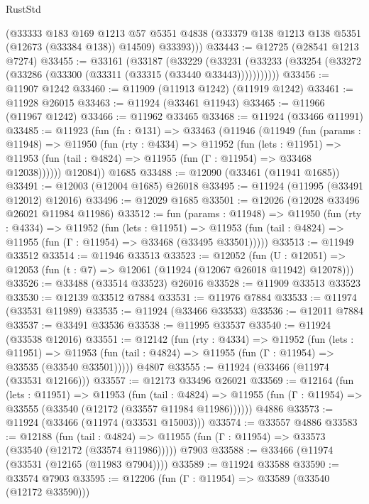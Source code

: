 \begin{lexlean}{RustStd}
\begin{coremodule}
{\begin{coremodule}
{{{{{{{{{{{{{{{{{{{{{{{{{{{{{{{{{{{{{{{{{{{{{{{{{{{{{{{{{{{{{{{{{{{{{{{{{{{{{{{{        (@33333
          @183
          @169
          @1213
          @57
          @5351
          @4838
          (@33379 @138 @1213 @138 @5351 (@12673 (@33384 @138)) @14509)
          @33393)))
@33443 := @12725 (@28541 @1213 @7274)
@33455 := @33161
    (@33187
      (@33229
        (@33231 (@33233 (@33254 (@33272 (@33286 (@33300 (@33311 (@33315 (@33440 @33443)))))))))))
@33456 := @11907 @1242
@33460 := @11909 (@11913 @1242) (@11919 @1242)
@33461 := @11928 @26015
@33463 := @11924 (@33461 @11943)
@33465 := @11966 (@11967 @1242)
@33466 := @11962 @33465
@33468 := @11924 (@33466 @11991)
@33485 := @11923
    (fun (fn : @131) =>
    @33463
      (@11946
        (@11949
          (fun (params : @11948) =>
          @11950
            (fun (rty : @4334) =>
            @11952
              (fun (lets : @11951) =>
              @11953 (fun (tail : @4824) => @11955 (fun (Γ : @11954) => @33468 @12038))))))
        @12084))
    @1685
@33488 := @12090 (@33461 (@11941 @1685))
@33491 := @12003 (@12004 @1685) @26018
@33495 := @11924 (@11995 (@33491 @12012) @12016)
@33496 := @12029 @1685
@33501 := @12026 (@12028 @33496 @26021 @11984 @11986)
@33512 := fun (params : @11948) =>
  @11950
    (fun (rty : @4334) =>
    @11952
      (fun (lets : @11951) =>
      @11953 (fun (tail : @4824) => @11955 (fun (Γ : @11954) => @33468 (@33495 @33501)))))
@33513 := @11949 @33512
@33514 := @11946 @33513
@33523 := @12052
    (fun (U : @12051) => @12053 (fun (t : @7) => @12061 (@11924 (@12067 @26018 @11942) @12078)))
@33526 := @33488 (@33514 @33523) @26016
@33528 := @11909 @33513 @33523
@33530 := @12139 @33512 @7884
@33531 := @11976 @7884
@33533 := @11974 (@33531 @11989)
@33535 := @11924 (@33466 @33533)
@33536 := @12011 @7884
@33537 := @33491 @33536
@33538 := @11995 @33537
@33540 := @11924 (@33538 @12016)
@33551 := @12142
    (fun (rty : @4334) =>
    @11952
      (fun (lets : @11951) =>
      @11953 (fun (tail : @4824) => @11955 (fun (Γ : @11954) => @33535 (@33540 @33501)))))
    @4807
@33555 := @11924 (@33466 (@11974 (@33531 @12166)))
@33557 := @12173 @33496 @26021
@33569 := @12164
    (fun (lets : @11951) =>
    @11953
      (fun (tail : @4824) =>
      @11955 (fun (Γ : @11954) => @33555 (@33540 (@12172 (@33557 @11984 @11986))))))
    @4886
@33573 := @11924 (@33466 (@11974 (@33531 @15003)))
@33574 := @33557 @4886
@33583 := @12188
    (fun (tail : @4824) => @11955 (fun (Γ : @11954) => @33573 (@33540 (@12172 (@33574 @11986)))))
    @7903
@33588 := @33466 (@11974 (@33531 (@12165 (@11983 @7904))))
@33589 := @11924 @33588
@33590 := @33574 @7903
@33595 := @12206 (fun (Γ : @11954) => @33589 (@33540 (@12172 @33590)))
}}}}}}}}}}}}}}}}}}}}}}}}}}}}}}}}}}}}}}}}}}}}}}}}}}}}}}}}}}}}}}}}}}}}}}}}}}}}}}}}
\end{coremodule}}
\end{coremodule}
\end{lexlean}
